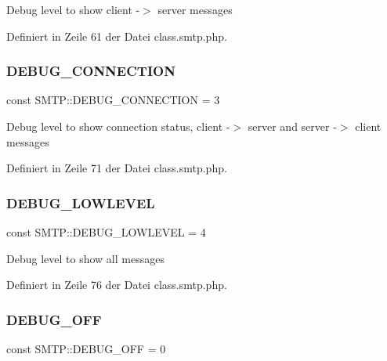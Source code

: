Debug level to show client -\/$>$ server messages 

Definiert in Zeile 61 der Datei class.\+smtp.\+php.

\mbox{\label{class_s_m_t_p_a61d2988ca01403ead2417bcf79ec5092}} 
\subsubsection{\texorpdfstring{D\+E\+B\+U\+G\+\_\+\+C\+O\+N\+N\+E\+C\+T\+I\+ON}{DEBUG\_CONNECTION}}
{\footnotesize\ttfamily const S\+M\+T\+P\+::\+D\+E\+B\+U\+G\+\_\+\+C\+O\+N\+N\+E\+C\+T\+I\+ON = 3}

Debug level to show connection status, client -\/$>$ server and server -\/$>$ client messages 

Definiert in Zeile 71 der Datei class.\+smtp.\+php.

\mbox{\label{class_s_m_t_p_a955e01b87400d0495c4ea3ba70228d89}} 
\subsubsection{\texorpdfstring{D\+E\+B\+U\+G\+\_\+\+L\+O\+W\+L\+E\+V\+EL}{DEBUG\_LOWLEVEL}}
{\footnotesize\ttfamily const S\+M\+T\+P\+::\+D\+E\+B\+U\+G\+\_\+\+L\+O\+W\+L\+E\+V\+EL = 4}

Debug level to show all messages 

Definiert in Zeile 76 der Datei class.\+smtp.\+php.

\mbox{\label{class_s_m_t_p_acb8c406fba86fbb2531dd98f22c6aeb1}} 
\subsubsection{\texorpdfstring{D\+E\+B\+U\+G\+\_\+\+O\+FF}{DEBUG\_OFF}}
{\footnotesize\ttfamily const S\+M\+T\+P\+::\+D\+E\+B\+U\+G\+\_\+\+O\+FF = 0}

